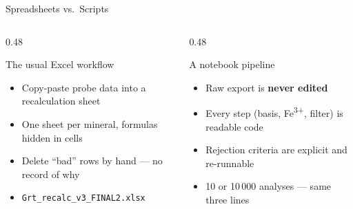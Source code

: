 \documentclass[aspectratio=169,11pt]{beamer}
\begin{document}
\begin{frame}{Spreadsheets vs.\ Scripts}
  \begin{columns}[T]
    \begin{column}{0.48\textwidth}
      \begin{alertblock}{The usual Excel workflow}
        \small
        \begin{itemize}
          \item Copy-paste probe data into a recalculation sheet
          \item One sheet per mineral, formulas hidden in cells
          \item Delete ``bad'' rows by hand --- no record of why
          \item \texttt{Grt\_recalc\_v3\_FINAL2.xlsx}
        \end{itemize}
      \end{alertblock}
    \end{column}
    \begin{column}{0.48\textwidth}
      \begin{exampleblock}{A notebook pipeline}
        \small
        \begin{itemize}
          \item Raw export is \textbf{never edited}
          \item Every step (basis, Fe\textsuperscript{3+}, filter) is readable code
          \item Rejection criteria are explicit and re-runnable
          \item 10 or 10\,000 analyses --- same three lines
        \end{itemize}
      \end{exampleblock}
    \end{column}
  \end{columns}
\end{frame}
\end{document}
